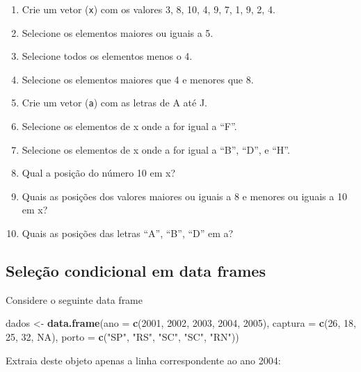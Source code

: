 \documentclass[10pt,a4paper]{book}
\newenvironment{Shaded}{\begin{snugshade}}{\end{snugshade}}
\newcommand{\KeywordTok}[1]{\textcolor[rgb]{0.13,0.29,0.53}{\textbf{#1}}}
\newcommand{\DataTypeTok}[1]{\textcolor[rgb]{0.13,0.29,0.53}{#1}}
\newcommand{\DecValTok}[1]{\textcolor[rgb]{0.00,0.00,0.81}{#1}}
\newcommand{\StringTok}[1]{\textcolor[rgb]{0.31,0.60,0.02}{#1}}
\newcommand{\OtherTok}[1]{\textcolor[rgb]{0.56,0.35,0.01}{#1}}
\newcommand{\NormalTok}[1]{#1}
\providecommand{\tightlist}{%
  \setlength{\itemsep}{0pt}\setlength{\parskip}{0pt}}
\begin{document}
\begin{enumerate}
\def\labelenumi{\arabic{enumi}.}
\tightlist
\item
  Crie um vetor (\texttt{x}) com os valores 3, 8, 10, 4, 9, 7, 1, 9, 2,
  4.
\item
  Selecione os elementos maiores ou iguais a 5.
\item
  Selecione todos os elementos menos o 4.
\item
  Selecione os elementos maiores que 4 e menores que 8.
\item
  Crie um vetor (\texttt{a}) com as letras de A até J.
\item
  Selecione os elementos de x onde a for igual a ``F''.
\item
  Selecione os elementos de x onde a for igual a ``B'', ``D'', e ``H''.
\item
  Qual a posição do número 10 em x?
\item
  Quais as posições dos valores maiores ou iguais a 8 e menores ou
  iguais a 10 em x?
\item
  Quais as posições das letras ``A'', ``B'', ``D'' em a?
\end{enumerate}

\subsection{Seleção condicional em data
frames}\label{seleuxe7uxe3o-condicional-em-data-frames}

Considere o seguinte data frame

\begin{Shaded}
\begin{Highlighting}[]
\NormalTok{dados <-}\StringTok{ }\KeywordTok{data.frame}\NormalTok{(}\DataTypeTok{ano =} \KeywordTok{c}\NormalTok{(}\DecValTok{2001}\NormalTok{, }\DecValTok{2002}\NormalTok{, }\DecValTok{2003}\NormalTok{, }\DecValTok{2004}\NormalTok{, }\DecValTok{2005}\NormalTok{),}
                    \DataTypeTok{captura =} \KeywordTok{c}\NormalTok{(}\DecValTok{26}\NormalTok{, }\DecValTok{18}\NormalTok{, }\DecValTok{25}\NormalTok{, }\DecValTok{32}\NormalTok{, }\OtherTok{NA}\NormalTok{),}
                    \DataTypeTok{porto =} \KeywordTok{c}\NormalTok{(}\StringTok{"SP"}\NormalTok{, }\StringTok{"RS"}\NormalTok{, }\StringTok{"SC"}\NormalTok{, }\StringTok{"SC"}\NormalTok{, }\StringTok{"RN"}\NormalTok{))}
\end{Highlighting}
\end{Shaded}

Extraia deste objeto apenas a linha correspondente ao ano 2004:
\end{document}
